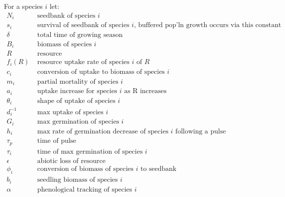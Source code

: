 \documentclass[11pt,a4paper,oneside]{article}
\begin{document}
\noindent For a species \(i\) let:
\begin{align*}
N_{i} & \text{   seedbank of species } i
\\
s_{i} & \text{   survival of seedbank of species } i \text{, buffered pop'ln
  growth occurs via this constant}
\\
\delta & \text{   total time of growing season}
\\
B_{i} &  \text{   biomass of species } i
\\
R &   \text{   resource}
\\
f_{i}(R) & \text{  resource uptake rate of species } i \text{ of } R
\\
c_{i} & \text{   conversion of uptake to biomass of species } i
\\
m_{i} & \text{   partial mortality of species } i
\\
a_{i} & \text{   uptake increase for species } i \text{ as R increases}
\\
\theta_{i} & \text{   shape of uptake of species } i
\\
d_{i}^{-1} & \text{   max uptake of species } i
\\
G_{i} & \text{   max germination of species } i
\\
h_{i} & \text{   max rate of germination decrease of species } i
\text{ following a pulse}
\\
\tau_{p} & \text{   time of pulse }
\\
\tau_{i} & \text{   time of max germination of species } i
\\
\epsilon & \text{   abiotic loss of resource}
\\
\phi_{i} & \text{   conversion of biomass of species } i \text{ to
  seedbank}
\\
b_{i} & \text{   seedling biomass of species } i
\\
\alpha & \text{   phenological tracking of species  } i
\\
\end{align*}
\end{document}
